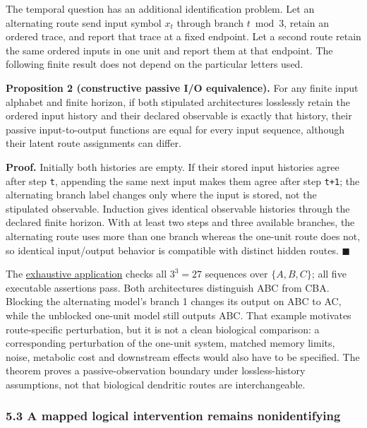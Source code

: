 \documentclass[
  american,
  11pt,
  letterpaper,
]{article}
\begin{document}
The temporal question has an additional identification problem. Let an alternating route send input symbol \(x_t\) through branch \(t\bmod 3\), retain an ordered trace, and report that trace at a fixed endpoint. Let a second route retain the same ordered inputs in one unit and report them at that endpoint. The following finite result does not depend on the particular letters used.

\textbf{Proposition 2 (constructive passive I/O equivalence).} For any finite input alphabet and finite horizon, if both stipulated architectures losslessly retain the ordered input history and their declared observable is exactly that history, their passive input-to-output functions are equal for every input sequence, although their latent route assignments can differ.

\textbf{Proof.} Initially both histories are empty. If their stored input histories agree after step \texttt{t}, appending the same next input makes them agree after step \texttt{t+1}; the alternating branch label changes only where the input is stored, not the stipulated observable. Induction gives identical observable histories through the declared finite horizon. With at least two steps and three available branches, the alternating route uses more than one branch whereas the one-unit route does not, so identical input/output behavior is compatible with distinct hidden routes. \(\blacksquare\)

The \href{https://github.com/v5ma/v5ma.github.io/blob/f6d3867df89ae9dea32f763b1d55c84212c41cc6/papers/companions/five-papers-20260923/temporal/paper/applications/observational-equivalence-v03/README.md}{exhaustive application} checks all \(3^3=27\) sequences over \(\{A,B,C\}\); all five executable assertions pass. Both architectures distinguish ABC from CBA. Blocking the alternating model's branch 1 changes its output on ABC to AC, while the unblocked one-unit model still outputs ABC. That example motivates route-specific perturbation, but it is not a clean biological comparison: a corresponding perturbation of the one-unit system, matched memory limits, noise, metabolic cost and downstream effects would also have to be specified. The theorem proves a passive-observation boundary under lossless-history assumptions, not that biological dendritic routes are interchangeable.

\subsubsection{5.3 A mapped logical intervention remains nonidentifying}\label{a-mapped-logical-intervention-remains-nonidentifying}
\end{document}
